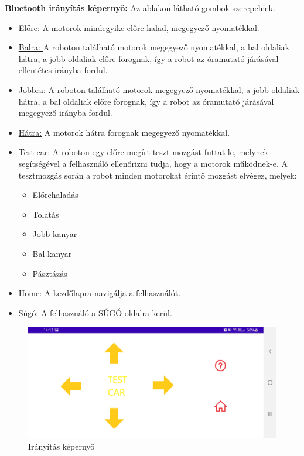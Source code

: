 \documentclass[]{thesis-ekf}
\theoremstyle{definition}
\begin{document}
\textbf{Bluetooth irányítás képernyő:} Az ablakon  látható gombok szerepelnek.
\begin{itemize}
	\item \underline{Előre:} A motorok mindegyike előre halad, megegyező nyomatékkal.
	\item \underline{Balra: }A roboton található motorok megegyező nyomatékkal, a bal oldaliak hátra, a jobb oldaliak előre forognak, így a robot az óramutató járásával ellentétes irányba fordul.
	\item \underline{Jobbra:} A roboton található motorok megegyező nyomatékkal, a jobb oldaliak hátra, a bal oldaliak előre forognak, így a robot az óramutató járásával megegyező irányba fordul.
	\item \underline{Hátra:} A motorok hátra forognak megegyező nyomatékkal.
	\item \underline{Test car:} A roboton egy előre megírt teszt mozgást futtat le, melynek segítségével a felhasználó ellenőrizni tudja, hogy a motorok működnek-e. A tesztmozgás során a robot minden motorokat érintő mozgást elvégez, melyek:
	\begin{itemize}
		\item Előrehaladás
		\item Tolatás
		\item Jobb kanyar
		\item Bal kanyar
		\item Pásztázás
	\end{itemize}
	\item \underline{Home:} A kezdőlapra navigálja a felhasználót.
	\item \underline{Súgó:} A felhasználó a SÚGÓ oldalra kerül.
\end{itemize}
\begin{figure}[h]
	\centering
	\includegraphics[width=\columnwidth]{images/app_screen/control_screen}
	\caption{Irányítás képernyő}
	\label{bluetooth-screen}
\end{figure}
\end{document}
